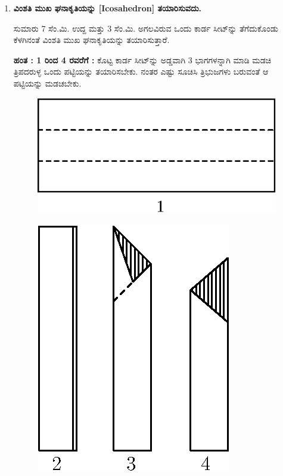 \begin{enumerate}
 \item \textbf{ವಿಂಶತಿ ಮುಖ ಘನಾಕೃತಿಯನ್ನು [Icosahedron] ತಯಾರಿಸುವದು.}
 
 ಸುಮಾರು 7 ಸೆಂ.ಮಿ. ಉದ್ದ ಮತ್ತು 3  ಸೆಂ.ಮಿ. ಅಗಲವಿರುವ ಒಂದು ಕಾರ್ಡ ಸೀಟ್‌ನ್ನು ತೆಗೆದುಕೊಂಡು ಕೆಳಗಿನಂತೆ ವಿಂಶತಿ ಮುಖ ಘನಾಕೃತಿಯನ್ನು ತಯಾರಿಸುತ್ತಾರೆ. 
 
 \textbf{ಹಂತ : 1 ರಿಂದ 4 ರವರೆಗೆ  :} ಕೊಟ್ಟ ಕಾರ್ಡ ಸೀಟ್‌ನ್ನು  ಅಡ್ಡವಾಗಿ 3 ಭಾಗಗಳನ್ನಾಗಿ ಮಾಡಿ ಮಡಚಿ ತ್ರಿಪದರುಳ್ಳ ಒಂದು ಪಟ್ಟಿಯನ್ನು ತಯಾರಿಸಬೇಕು. ನಂತರ ಎಷ್ಟು ಸೂಚಿಸಿ ತ್ರಿಭುಜಗಳು ಬರುವಂತೆ ಆ ಪಟ್ಟಿಯನ್ನು ಮಡಚಬೇಕು. 
 \begin{figure}[H]
\centering
\includegraphics[scale=.98]{src/figure/chap1/fig1-22a.eps}
\end{figure}
\begin{figure}[H]
\centering
\includegraphics[scale=.98]{src/figure/chap1/fig1-22b.eps}
\end{figure}


\end{enumerate}
